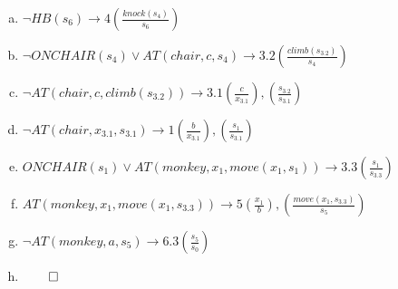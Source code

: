 \documentclass[11pt]{article}
\begin{document}
\begin{enumerate}[(a)]
\item $\neg HB(s_6) \rightarrow 4 \left(\frac{knock(s_4)}{s_6}\right )$
\item $\neg ONCHAIR(s_4) \vee AT(chair, c, s_4) \rightarrow 3.2 \left(\frac{climb(s_{3.2})}{s_4}\right)$
\item $\neg AT(chair, c, climb(s_{3.2})) \rightarrow 3.1 \left(\frac{c}{x_{3.1}}\right), \left(\frac{s_{3.2}}{s_{3.1}}\right)$
\item $\neg AT(chair, x_{3.1}, s_{3.1}) \rightarrow 1 \left(\frac{b}{x_{3.1}}\right), \left(\frac{s_1}{s_{3.1}}\right)$
\item $  ONCHAIR(s_1) \vee AT(monkey, x_1, move(x_1, s_1)) \rightarrow 3.3 \left(\frac{s_1}{s_{3.3}}\right)$
\item $ AT(monkey, x_1, move(x_1, s_{3.3})) \rightarrow 5 \left(\frac{x_1}{b}\right), \left(\frac{move(x_1,s_{3.3})}{s_5}\right)$
\item $ \neg AT(monkey, a, s_5) \rightarrow 6.3 \left(\frac{s_5}{s_0}\right) $
\item $\qed$
\end{enumerate}
\end{document}
